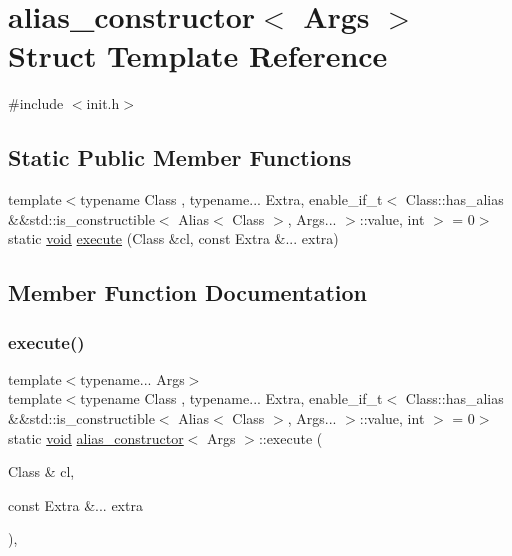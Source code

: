 \hypertarget{structalias__constructor}{}\section{alias\+\_\+constructor$<$ Args $>$ Struct Template Reference}
\label{structalias__constructor}


{\ttfamily \#include $<$init.\+h$>$}

\subsection*{Static Public Member Functions}
\begin{DoxyCompactItemize}
\item 
{\footnotesize template$<$typename Class , typename... Extra, enable\+\_\+if\+\_\+t$<$ Class\+::has\+\_\+alias \&\&std\+::is\+\_\+constructible$<$ Alias$<$ Class $>$, Args... $>$\+::value, int $>$  = 0$>$ }\\static \mbox{\hyperlink{_s_d_l__opengles2__gl2ext_8h_ae5d8fa23ad07c48bb609509eae494c95}{void}} \mbox{\hyperlink{structalias__constructor_a9334fc959d7252491b1419bdcc266def}{execute}} (Class \&cl, const Extra \&... extra)
\end{DoxyCompactItemize}


\subsection{Member Function Documentation}
\mbox{\label{structalias__constructor_a9334fc959d7252491b1419bdcc266def}} 
\subsubsection{\texorpdfstring{execute()}{execute()}}
{\footnotesize\ttfamily template$<$typename... Args$>$ \\
template$<$typename Class , typename... Extra, enable\+\_\+if\+\_\+t$<$ Class\+::has\+\_\+alias \&\&std\+::is\+\_\+constructible$<$ Alias$<$ Class $>$, Args... $>$\+::value, int $>$  = 0$>$ \\
static \mbox{\hyperlink{_s_d_l__opengles2__gl2ext_8h_ae5d8fa23ad07c48bb609509eae494c95}{void}} \mbox{\hyperlink{structalias__constructor}{alias\+\_\+constructor}}$<$ Args $>$\+::execute (\begin{DoxyParamCaption}\item[{Class \&}]{cl,  }\item[{const Extra \&...}]{extra }\end{DoxyParamCaption})\hspace{0.3cm}{\ttfamily [inline]}, {\ttfamily [static]}}



